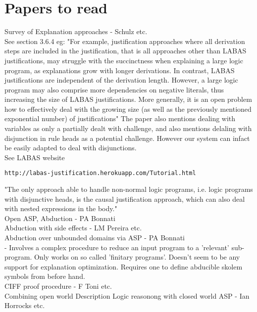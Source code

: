 \documentclass{article}
\begin{document}
\section{Papers to read}
Survey of Explanation approaches - Schulz etc.\\ 
\newline
See section 3.6.4 eg: "For example, justification approaches where all derivation steps are included in the
justification, that is all approaches other than LABAS justifications, may struggle
with the succinctness when explaining a large logic program, as explanations grow
with longer derivations. In contrast, LABAS justifications are independent of the
derivation length. However, a large logic program may also comprise more dependencies on negative literals, thus increasing the size of LABAS justifications. More
generally, it is an open problem how to effectively deal with the growing size (as
well as the previously mentioned exponential number) of justifications" The paper also mentions dealing with variables as only a partially dealt with challenge, and also mentions delaling with disjunction in rule heads as a potential challenge. However our system can infact be easily adapted to deal with disjunctions. \\
\newline
See LABAS website
\begin{verbatim}
http://labas-justification.herokuapp.com/Tutorial.html    
\end{verbatim}
"The only approach able to handle non-normal
logic programs, i.e. logic programs with disjunctive heads, is the causal justification
approach, which can also deal with nested expressions in the body."\\
\newline 
Open ASP, Abduction - PA Bonnati\\
Abduction with side effects - LM Pereira etc.\\
Abduction over unbounded domains via ASP - PA Bonnati\\ - Involves a complex procedure to reduce an input program to a 'relevant' sub-program. Only works on so called 'finitary programs'. Doesn't seem to be any support for explanation optimization. Requires one to define abducible skolem symbols from before hand.\\
\newline
CIFF proof procedure - F Toni etc.\\
Combining open world Description Logic reasonong with closed world ASP - Ian Horrocks etc.\\
\end{document}
